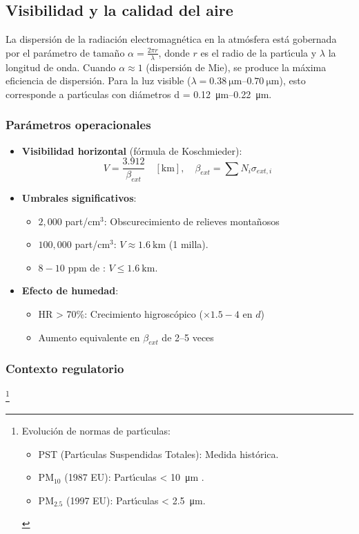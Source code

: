 \subsection{Visibilidad y la calidad del aire}

La dispersi\'on de la radiaci\'on electromagn\'etica en la atm\'osfera est\'a gobernada por el par\'ametro de tama\~no $\alpha = \frac{2\pi r}{\lambda}$, donde $r$ es el radio de la part\'{\i}cula y $\lambda$ la longitud de onda. Cuando $\alpha \approx 1$ (dispersi\'on de Mie), se produce la m\'axima eficiencia de dispersi\'on. Para la luz visible ($\lambda = \SIrange{0.38}{0.70}{\micro\metre}$), esto corresponde a part\'{\i}culas con di\'ametros d = \SIrange{0.12}{0.22}{\micro\metre}.
\subsubsection{Par\'ametros operacionales}
\begin{itemize}
    \item \textbf{Visibilidad horizontal} (f\'ormula de Koschmieder):\label{fKoschmieder}
    \begin{equation}
    V = \frac{3.912}{\beta_{ext}} \quad [\si{\kilo\metre}], \quad \beta_{ext} = \sum N_i\sigma_{ext,i}
    \end{equation}
    
    \item \textbf{Umbrales significativos}:
    \begin{itemize}
        \item $2,000$ part/cm$^3$: Obscurecimiento de relieves monta\~nosos
        \item $100,000$ part/cm$^3$: $V \approx \SI{1.6}{\kilo\metre}$ (1 milla).
        \item $8-10$ ppm de : $V \leq \SI{1.6}{\kilo\metre}$.
    \end{itemize}
    
    \item \textbf{Efecto de humedad}:
    \begin{itemize}
        \item HR > 70\%: Crecimiento higrosc\'opico ($\times 1.5-4$ en $d$)
        \item Aumento equivalente en $\beta_{ext}$ de 2--5 veces
    \end{itemize}
\end{itemize}

\subsubsection{Contexto regulatorio}\footnote{
Evoluci\'on de normas de part\'{\i}culas:
\begin{itemize}
    \item PST (Part\'{\i}culas Suspendidas Totales): Medida hist\'orica.
    \item PM$_{10}$ (1987 EU): Part\'{\i}culas < \SI{10}{\micro\metre} .
    \item PM$_{2.5}$ (1997 EU): Part\'{\i}culas < \SI{2.5}{\micro\metre}.
\end{itemize}
}

